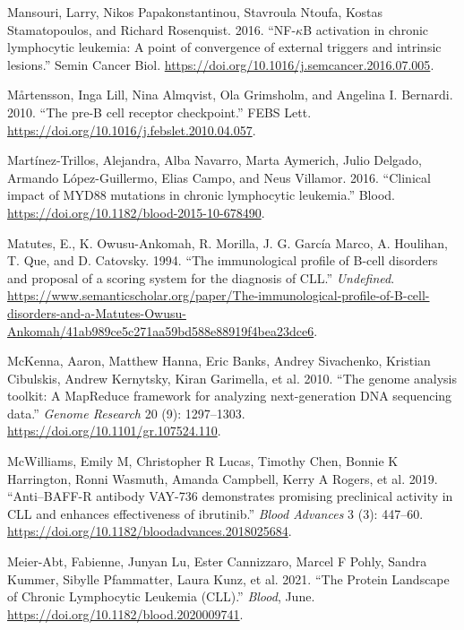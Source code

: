 \documentclass[11pt, a4paper, twosided]{book}
\newenvironment{CSLReferences}%
  {}%
  {\par}
\begin{document}
\begin{CSLReferences}{1}{0}
\leavevmode{}%
Mansouri, Larry, Nikos Papakonstantinou, Stavroula Ntoufa, Kostas Stamatopoulos, and Richard Rosenquist. 2016. {``{NF-\(\kappa\)B activation in chronic lymphocytic leukemia: A point of convergence of external triggers and intrinsic lesions}.''} Semin Cancer Biol. \url{https://doi.org/10.1016/j.semcancer.2016.07.005}.

\leavevmode{}%
Mårtensson, Inga Lill, Nina Almqvist, Ola Grimsholm, and Angelina I. Bernardi. 2010. {``{The pre-B cell receptor checkpoint}.''} FEBS Lett. \url{https://doi.org/10.1016/j.febslet.2010.04.057}.

\leavevmode{}%
Martínez-Trillos, Alejandra, Alba Navarro, Marta Aymerich, Julio Delgado, Armando López-Guillermo, Elias Campo, and Neus Villamor. 2016. {``{Clinical impact of MYD88 mutations in chronic lymphocytic leukemia}.''} Blood. \url{https://doi.org/10.1182/blood-2015-10-678490}.

\leavevmode{}%
Matutes, E., K. Owusu-Ankomah, R. Morilla, J. G. García Marco, A. Houlihan, T. Que, and D. Catovsky. 1994. {``{The immunological profile of B-cell disorders and proposal of a scoring system for the diagnosis of CLL.}''} \emph{Undefined}. \url{https://www.semanticscholar.org/paper/The-immunological-profile-of-B-cell-disorders-and-a-Matutes-Owusu-Ankomah/41ab989ce5c271aa59bd588e88919f4bea23dce6}.

\leavevmode{}%
McKenna, Aaron, Matthew Hanna, Eric Banks, Andrey Sivachenko, Kristian Cibulskis, Andrew Kernytsky, Kiran Garimella, et al. 2010. {``{The genome analysis toolkit: A MapReduce framework for analyzing next-generation DNA sequencing data}.''} \emph{Genome Research} 20 (9): 1297--1303. \url{https://doi.org/10.1101/gr.107524.110}.

\leavevmode{}%
McWilliams, Emily M, Christopher R Lucas, Timothy Chen, Bonnie K Harrington, Ronni Wasmuth, Amanda Campbell, Kerry A Rogers, et al. 2019. {``{Anti--BAFF-R antibody VAY-736 demonstrates promising preclinical activity in CLL and enhances effectiveness of ibrutinib}.''} \emph{Blood Advances} 3 (3): 447--60. \url{https://doi.org/10.1182/bloodadvances.2018025684}.

\leavevmode{}%
Meier-Abt, Fabienne, Junyan Lu, Ester Cannizzaro, Marcel F Pohly, Sandra Kummer, Sibylle Pfammatter, Laura Kunz, et al. 2021. {``{The Protein Landscape of Chronic Lymphocytic Leukemia (CLL).}''} \emph{Blood}, June. \url{https://doi.org/10.1182/blood.2020009741}.


\end{CSLReferences}
\end{document}
